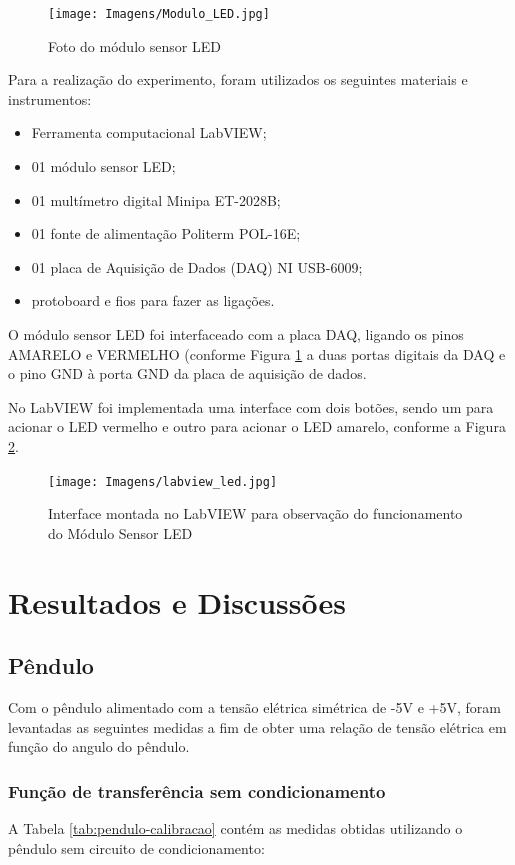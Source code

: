 \documentclass[a4paper]{instrumentacao}
\begin{document}
\begin{figure}[H]
\centering
\texttt{[image: Imagens/Modulo\_LED.jpg]}
\caption{Foto do módulo sensor LED}
\label{fig:modulo-led}
\end{figure}

Para a realização do experimento, foram utilizados os seguintes materiais e instrumentos:

\begin{itemize}
	\item Ferramenta computacional LabVIEW;
	\item 01 módulo sensor LED;
	\item 01 multímetro digital Minipa ET-2028B;
	\item 01 fonte de alimentação Politerm POL-16E;
	\item 01 placa de Aquisição de Dados (DAQ) NI  USB-6009;
	\item protoboard e fios para fazer as ligações. 
\end{itemize}

O módulo sensor LED foi interfaceado com a placa DAQ, ligando os pinos AMARELO e VERMELHO (conforme Figura \ref{fig:modulo-led} a duas portas digitais da DAQ e o pino GND à porta GND da placa de aquisição de dados.

No LabVIEW foi implementada uma interface com dois botões, sendo um para acionar o LED vermelho e outro para acionar o LED amarelo, conforme a Figura \ref{fig:labview-led}.

\begin{figure}[H]
\centering
\texttt{[image: Imagens/labview\_led.jpg]}
\caption{Interface montada no LabVIEW para observação do funcionamento do Módulo Sensor LED}
\label{fig:labview-led}
\end{figure}

\chapter{Resultados e Discussões}
\section{Pêndulo}

Com o pêndulo alimentado com a tensão elétrica simétrica de -5V e +5V, foram levantadas as seguintes medidas a fim de obter uma relação de tensão elétrica em função do angulo do pêndulo. 

\subsection{Função de transferência sem condicionamento}
A Tabela \ref{tab:pendulo-calibracao} contém as medidas obtidas utilizando o pêndulo sem circuito de condicionamento:
\end{document}

